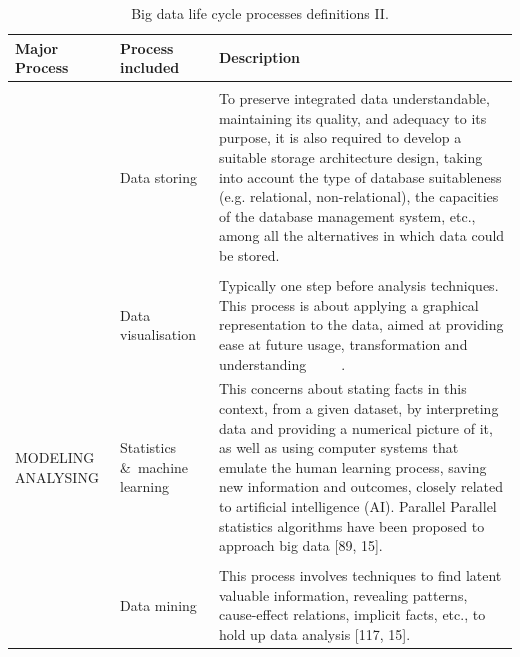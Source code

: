 \begin{table}[H]
    \caption{Big data life cycle processes definitions II.}
    \label{table:big_data_life_cyle_processes_definition_II}
    \centering
    \begin{tabular}{p{4.0cm} p{3.1cm} p{7cm}}
    \toprule
    \textbf{Major Process} & \textbf{Process included} & \textbf{Description} \\ 
    \bottomrule   
    & \\ &  Data storing & To preserve integrated data understandable, maintaining its quality, and
    adequacy to its purpose, it is also required to develop a suitable storage
    architecture design, taking into account the type of database suitableness (e.g. relational, non-relational),
    the capacities of the database management system, etc., among all the alternatives in which data could be stored. ~\cite{ComputingResearchAssociation}
    \\
    & \\ & Data visualisation & Typically one step before analysis
    techniques. This process is about applying a graphical representation to
    the data, aimed at providing ease at future usage, transformation and understanding ~\cite{Fayyad2002} ~\cite{Ware2012} ~\cite{Philip2014}.
    \\ 
    MODELING ANALYSING & Statistics \&\ machine learning & This concerns about stating facts in
    this context, from a given dataset, by interpreting data and providing a numerical picture of it, as well as using computer systems that emulate the human learning process, saving new information and outcomes,
    closely related to artificial intelligence (AI). Parallel Parallel statistics algorithms have been proposed to approach big data [89, 15].
    \\
    & \\ & Data mining & This process involves techniques to
    find latent valuable information, revealing patterns, cause-effect relations, implicit facts, etc., to hold up
    data analysis [117, 15].
    \\
    \bottomrule
\end{tabular}
\end{table}

